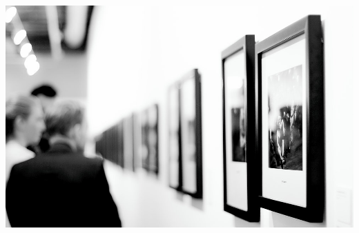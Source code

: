 	\begin{Figure}
	 \centering
	 \includegraphics[width=\linewidth]{images/Curator}
	 \label{fig:Curators looking at art}
	\end{Figure}

